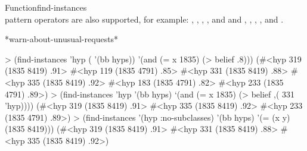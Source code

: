 \documentclass[10pt,twoside,english,pdftex]{article}
\begin{document}
\begin{functiondoc}{Function}{find-instances}{ \\ 
        \returns{} 
      }
 pattern operators are also
supported, for example: \code{=\&}, \code{=\$\&}, \code{=\$}, \code{=\$\$},
and \code{=\$\$\$} and , , ,
, and .

\begin{alsos}{*warn-about-unusual-requests*}
\end{alsos}

\fnexamples
{}%
%
\begin{example}
> (find-instances 'hyp ( '(bb hyps)) 
    '(and (= x 1835) (> belief .8)))
(#<hyp 319 (1835 8419) .91>
 #<hyp 119 (1835 4791) .85>
 #<hyp 331 (1835 8419) .88>
 #<hyp 335 (1835 8419) .92>
 #<hyp 183 (1835 4791) .82>
 #<hyp 233 (1835 4791) .89>)
> (find-instances 'hyp '(bb hyps)
    `(and (= x 1835) (> belief ,( 331 'hyp))))
(#<hyp 319 (1835 8419) .91>
 #<hyp 335 (1835 8419) .92>
 #<hyp 233 (1835 4791) .89>)
> (find-instances '(hyp :no-subclasses) '(bb hyps)
    '(= (x y) (1835 8419)))
(#<hyp 319 (1835 8419) .91>
 #<hyp 331 (1835 8419) .88>
 #<hyp 335 (1835 8419) .92>)
\end{example}

\end{functiondoc}

\end{document}
